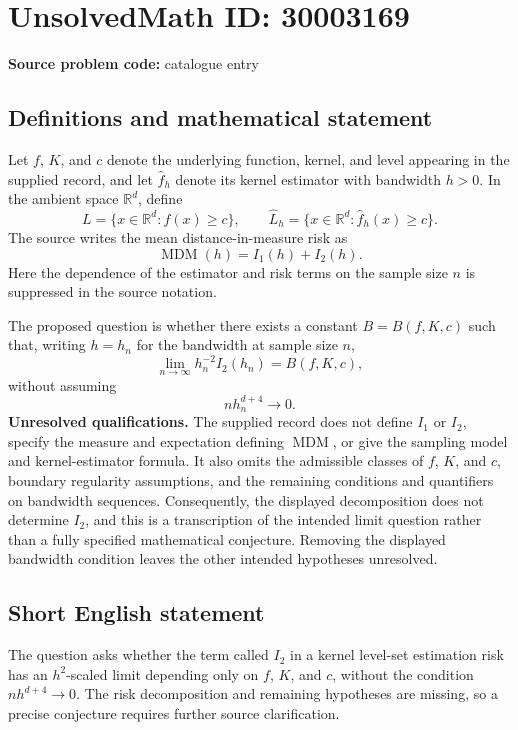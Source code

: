 \documentclass[11pt]{article}
\newcommand{\R}{\mathbb{R}}
\begin{document}
\section*{UnsolvedMath ID: 30003169}
\textbf{Source problem code:} catalogue entry
\subsection{Definitions and mathematical statement}
Let \(f\), \(K\), and \(c\) denote the underlying function, kernel, and level appearing in the supplied record, and let \(\widehat f_h\) denote its kernel estimator with bandwidth \(h>0\). In the ambient space \(\R^d\), define
\[
L=\{x\in\R^d:f(x)\geq c\},\qquad
\widehat L_h=\{x\in\R^d:\widehat f_h(x)\geq c\}.
\]
The source writes the mean distance-in-measure risk as
\[
\operatorname{MDM}(h)=I_1(h)+I_2(h).
\]
Here the dependence of the estimator and risk terms on the sample size \(n\) is suppressed in the source notation.

The proposed question is whether there exists a constant \(B=B(f,K,c)\) such that, writing \(h=h_n\) for the bandwidth at sample size \(n\),
\[
\lim_{n\to\infty}h_n^{-2}I_2(h_n)=B(f,K,c),
\]
without assuming
\[
nh_n^{d+4}\longrightarrow0.
\]
\textbf{Unresolved qualifications.} The supplied record does not define \(I_1\) or \(I_2\), specify the measure and expectation defining \(\operatorname{MDM}\), or give the sampling model and kernel-estimator formula. It also omits the admissible classes of \(f\), \(K\), and \(c\), boundary regularity assumptions, and the remaining conditions and quantifiers on bandwidth sequences. Consequently, the displayed decomposition does not determine \(I_2\), and this is a transcription of the intended limit question rather than a fully specified mathematical conjecture. Removing the displayed bandwidth condition leaves the other intended hypotheses unresolved.
\subsection{Short English statement}
The question asks whether the term called \(I_2\) in a kernel level-set estimation risk has an \(h^2\)-scaled limit depending only on \(f\), \(K\), and \(c\), without the condition \(nh^{d+4}\to0\). The risk decomposition and remaining hypotheses are missing, so a precise conjecture requires further source clarification.
\end{document}
